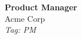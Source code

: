 \documentclass[11pt]{article}
\begin{document}
\begin{center}
  {\LARGE \textbf{Product Manager}} \\[4pt]
  {\large Acme Corp} \\[2pt]
  {\small \textit{Tag: PM}}
\end{center}

\vspace{1em}
\noindent
\end{document}
